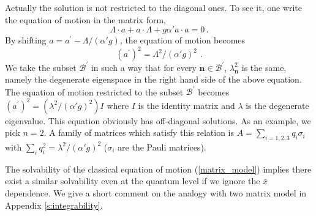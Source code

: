 \documentclass[a4paper,aps,preprint,nofootinbib,eqsecnum]{revtex4}
\begin{document}
Actually the solution is not restricted to the diagonal ones. To see it, one
write the equation of motion in the matrix form,
\begin{equation}
\Lambda \cdot a+a\cdot \Lambda +g{\alpha'} a\cdot a=0\,.
\end{equation}%
By shifting $a=a^{\prime }-\Lambda /({\alpha'} g)$,
the equation of motion becomes
\begin{equation}
(a^{\prime })^{2}=\Lambda ^{2}/({\alpha'}g)^{2}\,\,.
\end{equation}%
We take the subset $\mathcal{B}^{\prime }$ in such a way that for every $%
\mathbf{n}\in \mathcal{B}^{\prime }$, $\lambda _{\mathbf{n}}^{2}$ is the
same, namely the degenerate eigenspace in the right hand side of the above
equation. The equation of motion restricted to the subset $\mathcal{B}%
^{\prime }$ becomes $(a^{\prime })^{2}=\left( \lambda ^{2}
/({\alpha'}g)^{2}\right) I$
where $I$ is the identity matrix and $\lambda $ is the degenerate
eigenvalue. This equation obviously has off-diagonal solutions. As an
example, we pick $n=2$. A family of matrices which satisfy this relation is $%
A=\sum_{i=1,2,3}q_{i}\sigma _{i}$ with
$\sum_{i}q_{i}^{2}=\lambda ^{2}/({\alpha'}g)^{2}$
($\sigma _{i}$ are the Pauli matrices).

The solvability of the classical equation of motion (\ref{matrix_model})
implies there exist a similar solvability even at the quantum level if we
ignore the $\bar{x}$ dependence. We give a short comment on the analogy with
two matrix model in Appendix \ref{s:integrability}.
\end{document}
